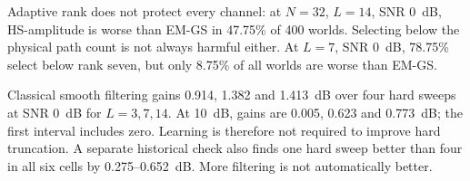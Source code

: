 Adaptive rank does not protect every channel: at $N=32$, $L=14$, SNR 0~dB, HS-amplitude is worse than EM-GS in 47.75\% of 400 worlds. Selecting below the physical path count is not always harmful either. At $L=7$, SNR 0~dB, 78.75\% select below rank seven, but only 8.75\% of all worlds are worse than EM-GS.

Classical smooth filtering gains 0.914, 1.382 and 1.413~dB over four hard sweeps at SNR 0~dB for $L=3,7,14$. At 10~dB, gains are 0.005, 0.623 and 0.773~dB; the first interval includes zero. Learning is therefore not required to improve hard truncation. A separate historical check also finds one hard sweep better than four in all six cells by 0.275--0.652~dB. More filtering is not automatically better.

